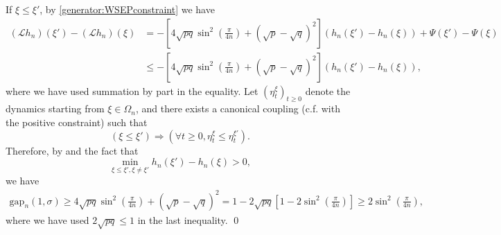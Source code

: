 \documentclass[reqno,11pt]{amsart}
\numberwithin{equation}{section}
\newcommand{\gO}{\Omega}
\newcommand{\cL}{{\ensuremath{\mathcal L}} }
\newcommand{\Gap}{\mathrm{gap}}
\begin{document}
If $\xi \le \xi'$,  by \eqref{generator:WSEPconstraint} we have
 \begin{equation}
 \begin{aligned}
 (\cL h_n)(\xi')-(\cL h_n)(\xi) &=- \left[ 4 \sqrt{pq} \sin^2\left(\frac{\pi}{4n}\right)+ (\sqrt{p}-\sqrt{q})^2  \right] \left( h_n(\xi')-h_n(\xi) \right) 
   + \Psi(\xi')-\Psi(\xi) \\
  & \le -\left[ 4 \sqrt{pq} \sin^2\left(\frac{\pi}{4n}\right)+ (\sqrt{p}-\sqrt{q})^2  \right] \left( h_n(\xi')-h_n(\xi) \right),
 \end{aligned}
 \end{equation}
 where we have used summation by part in the equality. Let $(\eta_t^{\xi})_{t \ge 0}$ denote the dynamics starting from $\xi \in \gO_n$, and there exists a canonical coupling (c.f. \cite[Appendix A]{labbe2018mixing} with the positive constraint) such that
 \begin{equation*}
 \left( \xi \le \xi'\right) \Rightarrow \left( \forall t \ge 0, \eta_t^{\xi} \le \eta_t^{\xi'} \right).
 \end{equation*}
Therefore, by \cite[Proposition 3]{wilson2004mixing} and the fact that
\begin{equation}
\min_{\xi\le \xi', \xi \neq \xi'} h_n(\xi')-h_n(\xi)>0,
\end{equation}
 we have
\begin{equation}
\begin{aligned}
\Gap_n(1, \sigma) \ge 4 \sqrt{pq} \sin^2\left(\frac{\pi}{4n}\right)+ (\sqrt{p}-\sqrt{q})^2=1-2\sqrt{pq}\left[1-2\sin^2\left(\frac{\pi}{4n}\right)\right] \ge 
2\sin^2 \left(\frac{\pi}{4n}\right),
\end{aligned}
\end{equation}
where  we have used $2 \sqrt{pq} \le 1$ in the last inequality.
\qed






\end{document}
